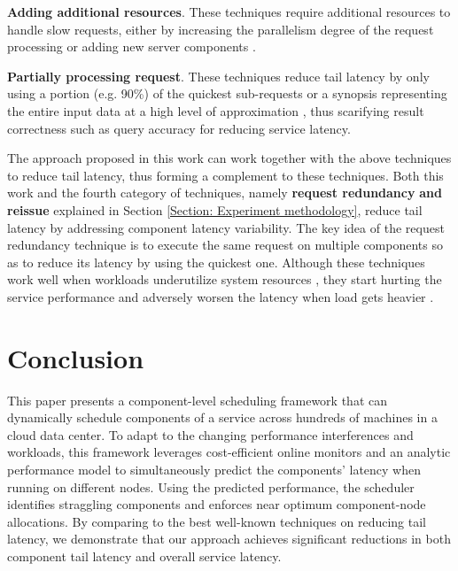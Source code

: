 \documentclass[10pt, conference, compsocconf]{IEEEtran}
\begin{document}
\textbf{Adding additional resources}. These techniques require additional resources to handle slow requests, either by increasing the parallelism degree of the request processing \cite{jeon2014predictive} or adding new server components \cite{stewart2013zoolander}.

\textbf{Partially processing request}. These techniques reduce tail latency by only using a portion (e.g. 90\%) of the quickest sub-requests \cite{jalaparti2013speeding} or a synopsis representing the entire input data at a high level of approximation \cite{han2015sarp}, thus scarifying result correctness such as query accuracy for reducing service latency.

The approach proposed in this work can work together with the above techniques to reduce tail latency, thus forming a complement to these techniques.
Both this work and the fourth category of techniques, namely \textbf{request redundancy} \cite{vulimiri2012more, ananthanarayanan2013effective,stewart2013zoolander} \textbf{and reissue} \cite{jalaparti2013speeding,tailatScale} explained in Section \ref{Section: Experiment methodology}, reduce tail latency by addressing component latency variability. The key idea of the request redundancy technique is to execute the same request on multiple components so as to reduce its latency by using the quickest one. Although these techniques work well when workloads underutilize system resources \cite{stewart2013zoolander}, they start hurting the service performance and adversely worsen the latency when load gets heavier \cite{shah2013redundant} .







\section{Conclusion} \label{Section: Conclusion}
This paper presents a component-level scheduling framework that can dynamically schedule components of a service across hundreds of machines in a cloud data center. To adapt to the changing performance interferences and workloads, this framework leverages cost-efficient online monitors and an analytic performance model to simultaneously predict the components' latency when running on different nodes. Using the predicted performance, the scheduler identifies straggling components and enforces near optimum component-node allocations. By comparing to the best well-known techniques on reducing tail latency, we demonstrate that our approach achieves significant reductions in both component tail latency and overall service latency.
\end{document}
